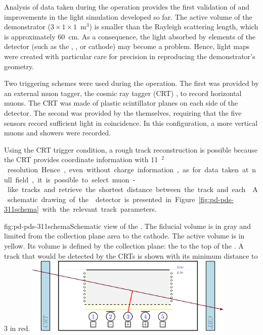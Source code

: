 
Analysis of data taken during the  operation provides the first validation of and improvements in the light simulation developed so far. 
The active volume of the demonstrator ($3\times1\times1$~m$^3$) is smaller than the Rayleigh scattering length, which is approximately \SI{60}{\cm}. 
As a consequence, the light absorbed by elements of the detector (such as the , , or cathode) may become a problem.
Hence, light maps were created with particular care for precision in reproducing the demonstrator's geometry.

Two triggering schemes were used during the  operation.
The first was provided by an external muon tagger, the cosmic ray tagger (CRT) , to record horizontal muons. The CRT was made of plastic scintillator planes on each side of the detector.
The second was provided by the  themselves, requiring that the five sensors record sufficient light in coincidence. In this configuration, a more vertical muons and showers were recorded.

Using the CRT trigger condition, a rough track reconstruction is possible because the CRT provides coordinate information with \SI{11}{\cm$^2$} resolution. Hence, even without charge information, as for data taken at null field, it is possible to select muon-like tracks and retrieve the shortest distance between the track and each . A schematic drawing of the  detector is presented in Figure~\ref{fig:pd-pds-311schema} with the relevant track parameters.

\begin{dunefigure}{fig:pd-pds-311schema}{Schematic view of the . 
The fiducial volume is in gray and limited from the collection plane area to the cathode. The active volume is in yellow. Its volume is defined by the collection plane: the  to the top of the . A track that would be detected by the CRTs is shown with its minimum distance to  \num{3} in red.}
\includegraphics[width=0.75\textwidth]{graphics/dppd_7_2_v2}
\end{dunefigure}


